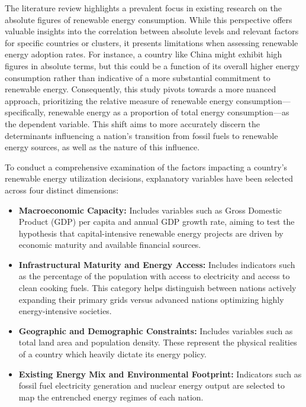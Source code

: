 \documentclass[a4paper,11pt]{article}
\begin{document}
The literature review highlights a prevalent focus in existing research on the absolute figures of renewable energy consumption.
While this perspective offers valuable insights into the correlation between absolute levels and relevant factors for specific countries or clusters, it presents limitations when assessing renewable energy adoption rates.
For instance, a country like China might exhibit high figures in absolute terms, but this could be a function of its overall higher energy consumption rather than indicative of a more substantial commitment to renewable energy.
Consequently, this study pivots towards a more nuanced approach, prioritizing the relative measure of renewable energy consumption—specifically, renewable energy as a proportion of total energy consumption—as the dependent variable.
This shift aims to more accurately discern the determinants influencing a nation's transition from fossil fuels to renewable energy sources, as well as the nature of this influence.

To conduct a comprehensive examination of the factors impacting a country's renewable energy utilization decisions, explanatory variables have been selected across four distinct dimensions:
\begin{itemize}
    \item \textbf{Macroeconomic Capacity:} Includes variables such as Gross Domestic Product (GDP) per capita and annual GDP growth rate, aiming to test the hypothesis that capital-intensive renewable energy projects are driven by economic maturity and available financial sources.
    \item \textbf{Infrastructural Maturity and Energy Access:} Includes indicators such as the percentage of the population with access to electricity and access to clean cooking fuels. This category helps distinguish between nations actively expanding their primary grids versus advanced nations optimizing highly energy-intensive societies.
    \item \textbf{Geographic and Demographic Constraints:} Includes variables such as total land area and population density. These represent the physical realities of a country which heavily dictate its energy policy.
    \item \textbf{Existing Energy Mix and Environmental Footprint:} Indicators such as fossil fuel electricity generation and nuclear energy output are selected to map the entrenched energy regimes of each nation.
\end{itemize}
\end{document}

